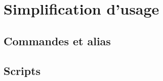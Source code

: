 \chapter{Simplification d'usage}
\label{ch:simple}


\section{Commandes et alias}
\section{Scripts}
